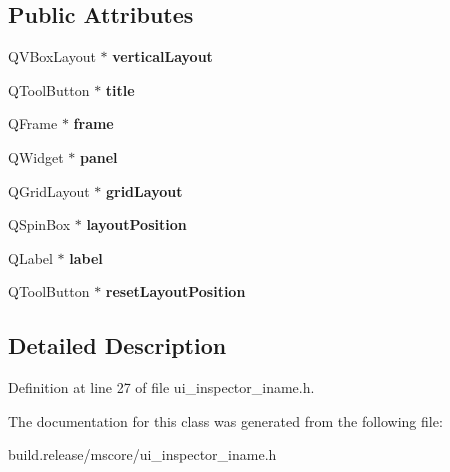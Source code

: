\subsection*{Public Attributes}
\begin{DoxyCompactItemize}
\item 
\mbox{\label{class_ui___inspector_iname_aa8033134a6024c8163b7886ee570a46b}} 
Q\+V\+Box\+Layout $\ast$ {\bfseries vertical\+Layout}
\item 
\mbox{\label{class_ui___inspector_iname_acfb6b95a8f1ea122d410701ba76e442b}} 
Q\+Tool\+Button $\ast$ {\bfseries title}
\item 
\mbox{\label{class_ui___inspector_iname_a84a8a62a932ae3d8816b2d5f0cbb0535}} 
Q\+Frame $\ast$ {\bfseries frame}
\item 
\mbox{\label{class_ui___inspector_iname_a0660b655de475af944ede9fa7293c014}} 
Q\+Widget $\ast$ {\bfseries panel}
\item 
\mbox{\label{class_ui___inspector_iname_af9efda4fde30e187ab11909644c4b41c}} 
Q\+Grid\+Layout $\ast$ {\bfseries grid\+Layout}
\item 
\mbox{\label{class_ui___inspector_iname_a91ec393e255a7ab8f05f7a22d0f0a4e1}} 
Q\+Spin\+Box $\ast$ {\bfseries layout\+Position}
\item 
\mbox{\label{class_ui___inspector_iname_a3918ea4673dc21e0e71036d030d888dc}} 
Q\+Label $\ast$ {\bfseries label}
\item 
\mbox{\label{class_ui___inspector_iname_ade2e52e98c7e7e21234d9a8a36adeffd}} 
Q\+Tool\+Button $\ast$ {\bfseries reset\+Layout\+Position}
\end{DoxyCompactItemize}


\subsection{Detailed Description}


Definition at line 27 of file ui\+\_\+inspector\+\_\+iname.\+h.



The documentation for this class was generated from the following file\+:\begin{DoxyCompactItemize}
\item 
build.\+release/mscore/ui\+\_\+inspector\+\_\+iname.\+h\end{DoxyCompactItemize}
